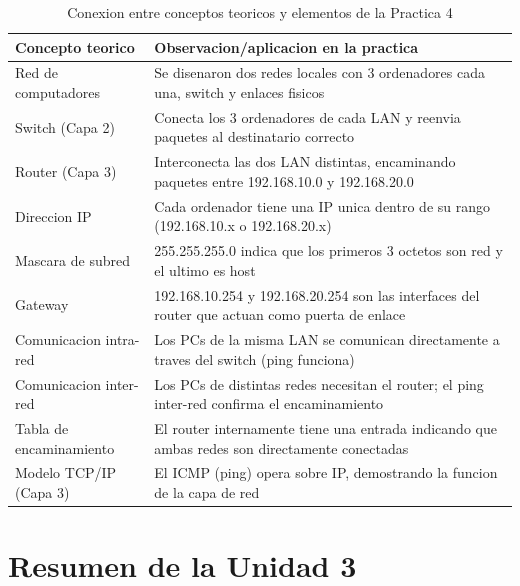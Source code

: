 \begin{table}[htbp]
\centering
\small
\caption{Conexion entre conceptos teoricos y elementos de la Practica 4}
\begin{tabularx}{\textwidth}{@{}lX@{}}
\toprule
\textbf{Concepto teorico} & \textbf{Observacion/aplicacion en la practica} \\
\midrule
Red de computadores & Se disenaron dos redes locales con 3 ordenadores cada una, switch y enlaces fisicos \\
Switch (Capa 2) & Conecta los 3 ordenadores de cada LAN y reenvia paquetes al destinatario correcto \\
Router (Capa 3) & Interconecta las dos LAN distintas, encaminando paquetes entre 192.168.10.0 y 192.168.20.0 \\
Direccion IP & Cada ordenador tiene una IP unica dentro de su rango (192.168.10.x o 192.168.20.x) \\
Mascara de subred & 255.255.255.0 indica que los primeros 3 octetos son red y el ultimo es host \\
Gateway & 192.168.10.254 y 192.168.20.254 son las interfaces del router que actuan como puerta de enlace \\
Comunicacion intra-red & Los PCs de la misma LAN se comunican directamente a traves del switch (ping funciona) \\
Comunicacion inter-red & Los PCs de distintas redes necesitan el router; el ping inter-red confirma el encaminamiento \\
Tabla de encaminamiento & El router internamente tiene una entrada indicando que ambas redes son directamente conectadas \\
Modelo TCP/IP (Capa 3) & El ICMP (ping) opera sobre IP, demostrando la funcion de la capa de red \\
\bottomrule
\end{tabularx}
\end{table}


\section{Resumen de la Unidad 3}

